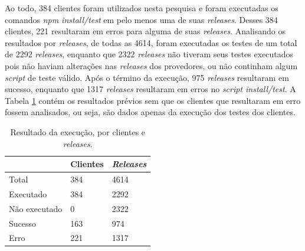 

Ao todo, 384 clientes foram utilizados nesta pesquisa e foram executadas os comandos \textit{npm install/test} em pelo menos uma de suas \textit{releases}. Desses 384 clientes, 221 resultaram em erros para alguma de suas \textit{releases}. Analisando os resultados por \textit{releases}, de todas as 4614, foram executadas os testes de um total de 2292 \textit{releases}, enquanto que 2322 \textit{releases} não tiveram seus testes executados pois não haviam alterações nas \textit{releases} dos provedores, ou não continham algum \textit{script} de teste válido. Após o término da execução, 975 \textit{releases} resultaram em sucesso, enquanto que 1317 \textit{releases} resultaram em erros no \textit{script install/test}. A Tabela \ref{tab:res_rq1_1} contém os resultados prévios sem que os clientes que resultaram em erro fossem analisados, ou seja, são dados apenas da execução dos testes dos clientes.

\begin{table}[]
\centering
\begin{tabular}{|l|l|l|}
\hline
                    & Clientes & \textit{Releases} \\ \hline
    Total           & 384     & 4614     \\
    Executado       & 384     & 2292     \\
    Não executado   & 0       & 2322     \\
    Sucesso         & 163     & 974     \\
    Erro            & 221     & 1317     \\ \hline
\end{tabular}
\caption{Resultado da execução, por clientes e \textit{releases}.}
\label{tab:res_rq1_1}
\end{table}

